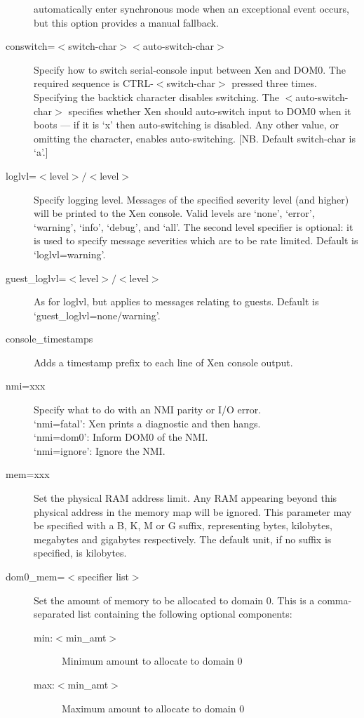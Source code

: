 \documentclass[11pt,twoside,final,openright]{report}
\begin{document}
\begin{description}
  automatically enter synchronous mode when an exceptional event
  occurs, but this option provides a manual fallback.
\item [ conswitch=$<$switch-char$><$auto-switch-char$>$ ] Specify how
  to switch serial-console input between Xen and DOM0. The required
  sequence is CTRL-$<$switch-char$>$ pressed three times. Specifying
  the backtick character disables switching.  The
  $<$auto-switch-char$>$ specifies whether Xen should auto-switch
  input to DOM0 when it boots --- if it is `x' then auto-switching is
  disabled.  Any other value, or omitting the character, enables
  auto-switching.  [NB. Default switch-char is `a'.]
\item [ loglvl=$<$level$>/<$level$>$ ]
  Specify logging level. Messages of the specified severity level (and
  higher) will be printed to the Xen console. Valid levels are `none',
  `error', `warning', `info', `debug', and `all'. The second level
  specifier is optional: it is used to specify message severities
  which are to be rate limited. Default is `loglvl=warning'.
\item [ guest\_loglvl=$<$level$>/<$level$>$ ] As for loglvl, but
  applies to messages relating to guests. Default is
  `guest\_loglvl=none/warning'. 
\item [ console\_timestamps ] 
  Adds a timestamp prefix to each line of Xen console output.
\item [ nmi=xxx ]
  Specify what to do with an NMI parity or I/O error. \\
  `nmi=fatal':  Xen prints a diagnostic and then hangs. \\
  `nmi=dom0':   Inform DOM0 of the NMI. \\
  `nmi=ignore': Ignore the NMI.
\item [ mem=xxx ] Set the physical RAM address limit. Any RAM
  appearing beyond this physical address in the memory map will be
  ignored. This parameter may be specified with a B, K, M or G suffix,
  representing bytes, kilobytes, megabytes and gigabytes respectively.
  The default unit, if no suffix is specified, is kilobytes.
\item [ dom0\_mem=$<$specifier list$>$ ] Set the amount of memory to
  be allocated to domain 0. This is a comma-separated list containing
  the following optional components:
  \begin{description}
  \item[ min:$<$min\_amt$>$ ] Minimum amount to allocate to domain 0
  \item[ max:$<$min\_amt$>$ ] Maximum amount to allocate to domain 0

\end{description}
\end{description}
\end{document}

